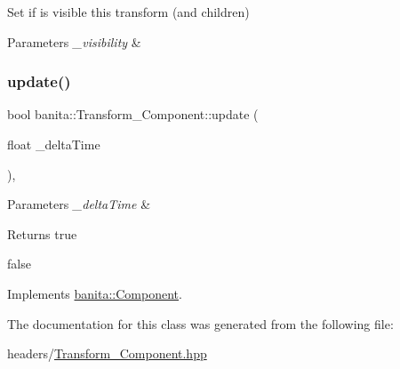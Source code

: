 Set if is visible this transform (and children) 


\begin{DoxyParams}{Parameters}
{\em \+\_\+visibility} & \\
\hline
\end{DoxyParams}
\mbox{\label{classbanita_1_1_transform___component_a0ca137a40cc84ee0825f37bab82d5d5d}} 
\subsubsection{\texorpdfstring{update()}{update()}}
{\footnotesize\ttfamily bool banita\+::\+Transform\+\_\+\+Component\+::update (\begin{DoxyParamCaption}\item[{float}]{\+\_\+delta\+Time }\end{DoxyParamCaption})\hspace{0.3cm}{\ttfamily [override]}, {\ttfamily [virtual]}}


\begin{DoxyParams}{Parameters}
{\em \+\_\+delta\+Time} & \\
\hline
\end{DoxyParams}
\begin{DoxyReturn}{Returns}
true 

false 
\end{DoxyReturn}


Implements \mbox{\hyperlink{classbanita_1_1_component_ae8f9d11dc8e3c920d6d40146668c429b}{banita\+::\+Component}}.



The documentation for this class was generated from the following file\+:\begin{DoxyCompactItemize}
\item 
headers/\mbox{\hyperlink{_transform___component_8hpp}{Transform\+\_\+\+Component.\+hpp}}\end{DoxyCompactItemize}

